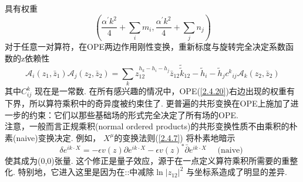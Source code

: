具有权重
\begin{equation}
\left(\frac{\alpha^{\prime} k^{2}}{4}+\sum_{i} m_{i}, \frac{\alpha^{\prime} k^{2}}{4}+\sum_{j} n_{j}\right)
\end{equation}
对于任意一对算符，在OPE两边作用刚性变换，重新标度与旋转完全决定系数函数的z依赖性
\begin{equation}\label{2.4.20}
\mathscr{A}_{i}\left(z_{1}, \bar{z}_{1}\right) \mathscr{A}_{j}\left(z_{2}, \bar{z}_{2}\right)=\sum_{k} z_{12}^{h_{k}-h_{i}-h_{j}} \bar{z}_{12} \tilde{\tilde{k}}_{12}-{\tilde{h}_{i}-\tilde{h}_{j}} c{ }^{k}{ }_{i j} \mathscr{A}_{k}\left(z_{2}, \bar{z}_{2}\right)
\end{equation}
其中$C^k_{ij}$ 现在是一常数. 在所有感兴趣的情况中，OPE(\ref{2.4.20})右边出现的权重有下界，所以算符乘积中的奇异度被约束住了. 更普遍的共形变换在OPE上施加了进一步的约束：它们以那些基础场的形式完全决定了所有场的OPE.\\
注意，一般而言正规乘积(normal ordered
products)的共形变换性质不由乘积的朴素(naive)变换决定. 例如， $X^\mu$的变换法则(\ref{2.4.7}) 将朴素地暗示
\begin{equation}
\delta e^{i k \cdot X}=-\epsilon v(z) \partial e^{i k \cdot X}-\epsilon v(z)^{*} \bar{\partial} e^{i k \cdot X} \quad \text { (naive) }
\end{equation}
使其成为(0,0)张量. 这个修正是量子效应，源于在一点定义算符乘积所需要的重整化. 特别地，它进入这里是因为在::中减除$\ln \left|z_{12}\right|^{2}$ 与坐标系造成了明显的差异. 

